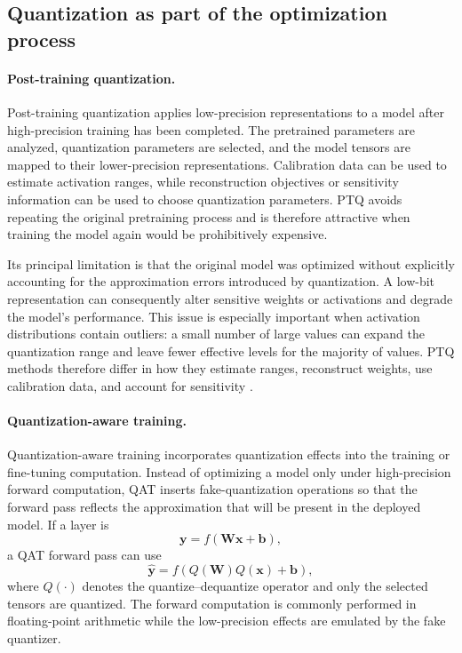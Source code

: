 \subsection{Quantization as part of the optimization process}
\label{subsec:quantization-optimization}

\paragraph{Post-training quantization.}
Post-training quantization applies low-precision representations to a
model after high-precision training has been completed. The pretrained
parameters are analyzed, quantization parameters are selected, and the
model tensors are mapped to their lower-precision representations.
Calibration data can be used to estimate activation ranges, while
reconstruction objectives or sensitivity information can be used to
choose quantization parameters. PTQ avoids repeating the original
pretraining process and is therefore attractive when training the model
again would be prohibitively expensive.

Its principal limitation is that the original model was optimized
without explicitly accounting for the approximation errors introduced
by quantization. A low-bit representation can consequently alter
sensitive weights or activations and degrade the model's performance.
This issue is especially important when activation distributions contain
outliers: a small number of large values can expand the quantization
range and leave fewer effective levels for the majority of values.
PTQ methods therefore differ in how they estimate ranges, reconstruct
weights, use calibration data, and account for sensitivity
\parencite{chen2026llmquantization}.

\paragraph{Quantization-aware training.}
Quantization-aware training incorporates quantization effects into the
training or fine-tuning computation. Instead of optimizing a model only
under high-precision forward computation, QAT inserts fake-quantization
operations so that the forward pass reflects the approximation that
will be present in the deployed model. If a layer is
\begin{equation}
    \mathbf{y}=f(\mathbf{W}\mathbf{x}+\mathbf{b}),
    \label{eq:quant-full-precision-layer}
\end{equation}
a QAT forward pass can use
\begin{equation}
    \widehat{\mathbf{y}}
    =
    f\left(
        Q(\mathbf{W})Q(\mathbf{x})+\mathbf{b}
    \right),
    \label{eq:quant-qat-forward}
\end{equation}
where \(Q(\cdot)\) denotes the quantize--dequantize operator and only
the selected tensors are quantized. The forward computation is commonly
performed in floating-point arithmetic while the low-precision effects
are emulated by the fake quantizer.

